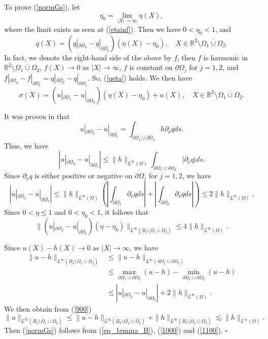 \documentclass[11pt,a4paper]{article}
\numberwithin{equation}{section}
\newcommand{\qed}{\hfill \ensuremath{\square}}
\newcommand{\p}{\partial}
\newcommand{\norm}[1]{\| #1 \|}
\newcommand{\eqnref}[1]{(\ref {#1})}
\newcommand{\Rbb}{\mathbb{R}}
\newcommand{\Gd}{\delta}
\newcommand{\Gn}{\eta}
\newcommand{\Gs}{\sigma}
\newcommand{\GO}{\Omega}
\newcommand{\beq}{\begin{equation}}
\newcommand{\eeq}{\end{equation}}
\begin{document}
To prove \eqnref{normGs}, let
$$
\Gn_0 = \lim_{|X| \to \infty} \Gn(X),
$$
where the limit exists as seen at \eqnref{etainf}. Then we have $0< \Gn_0 < 1$, and
\beq\label{qeta}
q(X) = \left(q|_{\p \GO_2} - q|_{\p \GO_1}\right) \left(\Gn(X) - \Gn_0\right), \quad X \in \Rbb^2 \setminus \overline{\GO_1 \cup \GO_2}.
\eeq
In fact, we denote the right-hand side of the above by $f$, then $f$ is harmonic in $\Rbb^2 \setminus \overline{\GO_1 \cup \GO_2}$, $f(X) \to 0$ as $|X| \to \infty$, $f$ is constant on $\p\GO_j$ for $j=1,2$, and $f|_{\p\GO_2} - f|_{\p\GO_1}=q|_{\p\GO_2} - q|_{\p\GO_1}$. So, \eqnref{qeta} holds.
We then have
\beq\label{eq_1emma_B}
\Gs(X) = \left ( u |_{\p \GO_1} -  u |_{\p \GO_2}\right) \left(\Gn(X) - \Gn_0\right) + u(X), \quad X \in \Rbb^2 \setminus \overline{\GO_1 \cup \GO_2}.
\eeq


It was proven in \cite{Y} that
\beq\label{the_presentation_potential_diff_u}
u |_{\p \GO_2} -  u |_{\p \GO_1} = \int_{\p \GO_1 \cup \p \GO_2} h \p_{\nu} q ds.
\eeq
Thus, we have
$$
\left|  u |_{\p \GO_2} -  u |_{\p \GO_1} \right|\leq  \norm{h}_{L^{\infty}(\GO)} \int_{\p\GO_1 \cup \p\GO_2} |\p_{\nu} q| ds .
$$
Since $\p_{\nu} q$ is either positive or negative on $\p\GO_j$ for $j=1,2$, we have
\beq\label{900}
\left|  u |_{\p \GO_2} -  u |_{\p \GO_1} \right| \leq \norm{h}_{L^{\infty}(\GO)} \left(\left | \int_{\p \GO_1} \p_{\nu} q ds \right | + \left| \int_{ \p \GO_2} \p_{\nu} q ds \right| \right) \leq 2  \norm{ h}_{L^{\infty}(\GO)} .
\eeq
Since $0< \Gn \leq 1$ and $0< \Gn_0 < 1$, it follows that
\beq\label{1000}
\norm {\left ( u |_{\p \GO_2} -  u |_{\p \GO_1}\right) \left(\Gn - \Gn_0\right) }_{L^{\infty} (B_{\Gd} \setminus \overline{\GO_1 \cup \GO_2})} \leq 4  \norm{h} _{L^{\infty} (\GO)}.
\eeq

Since $u(X)-h(X) \to 0$ as $|X| \to \infty$, we have
\begin{align*}
\norm{u-h}_{L^{\infty} (B_{\Gd} \setminus \overline{\GO_1 \cup \GO_2})} & \le \norm{u-h}_{L^{\infty} ({\p \GO_1 \cup \p \GO_2})} \\
& \le \max_{\p \GO_1 \cup \p \GO_2} (u-h) - \min_{\p \GO_1 \cup \p \GO_2} (u-h) \\
& \le \left|  u |_{\p \GO_2} - u |_{\p \GO_1} \right|  + 2\norm{h}_{L^{\infty}(\GO)}.
\end{align*}
We then obtain from \eqnref{900}
\beq\label{1100}
\norm{u}_{L^{\infty}(B_{\Gd} \setminus \overline{\GO_1 \cup \GO_2})} \leq \norm {u-h}_{L^{\infty} (B_{\Gd} \setminus \overline{\GO_1 \cup \GO_2})} + \norm{h}_{L^{\infty}(B_{\Gd} \setminus \overline{\GO_1 \cup \GO_2})} \lesssim \norm{h}_{L^{\infty}(\GO)}.
\eeq
Then \eqnref{normGs} follows from \eqnref{eq_1emma_B}, \eqnref{1000} and \eqnref{1100}.
\qed
\end{document}

